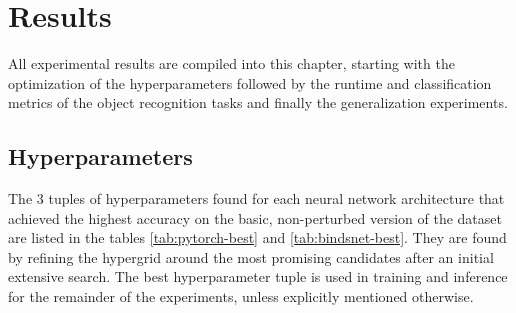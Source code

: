 \chapter{Results}\label{chapter:results}
All experimental results are compiled into this chapter, starting with the optimization of the hyperparameters followed by the runtime and classification metrics of the object recognition tasks and finally the generalization experiments.
\section{Hyperparameters}
The 3 tuples of hyperparameters found for each neural network architecture that achieved the highest accuracy on the basic, non-perturbed version of the dataset are listed in the tables \ref{tab:pytorch-best} and \ref{tab:bindsnet-best}. They are found by refining the hypergrid around the most promising candidates after an initial extensive search. The best hyperparameter tuple is used in training and inference for the remainder of the experiments, unless explicitly mentioned otherwise.
